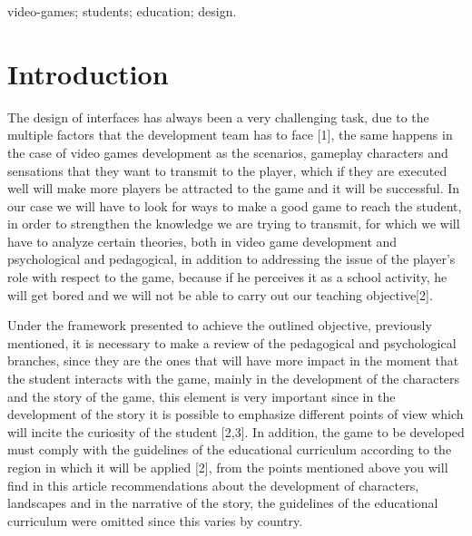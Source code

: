 \documentclass[conference, letterpaper]{IEEEtran}
\begin{document}


\begin{IEEEkeywords}
video-games; students; education; design.
\end{IEEEkeywords}


%
\IEEEpeerreviewmaketitle



\section{Introduction}

The design of interfaces has always been a very challenging task, due to the multiple factors that the development team has to face [1], the same happens in the case of video games development as the scenarios, gameplay characters and sensations that they want to transmit to the player, which if they are executed well will make more players be attracted to the game and it will be successful. In our case we will have to look for ways to make a good game to reach the student, in order to strengthen the knowledge we are trying to transmit, for which we will have to analyze certain theories, both in video game development and psychological and pedagogical, in addition to addressing the issue of the player's role with respect to the game, because if he perceives it as a school activity, he will get bored and we will not be able to carry out our teaching objective[2].

Under the framework presented to achieve the outlined objective, previously mentioned, it is necessary to make a review of the pedagogical and psychological branches, since they are the ones that will have more impact in the moment that the student interacts with the game, mainly in the development of the characters and the story of the game, this element is very important since in the development of the story it is possible to emphasize different points of view which will incite the curiosity of the student [2,3]. In addition, the game to be developed must comply with the guidelines of the educational curriculum according to the region in which it will be applied [2], from the points mentioned above you will find in this article recommendations about the development of characters, landscapes and in the narrative of the story, the guidelines of the educational curriculum were omitted since this varies by country.
\end{document}
